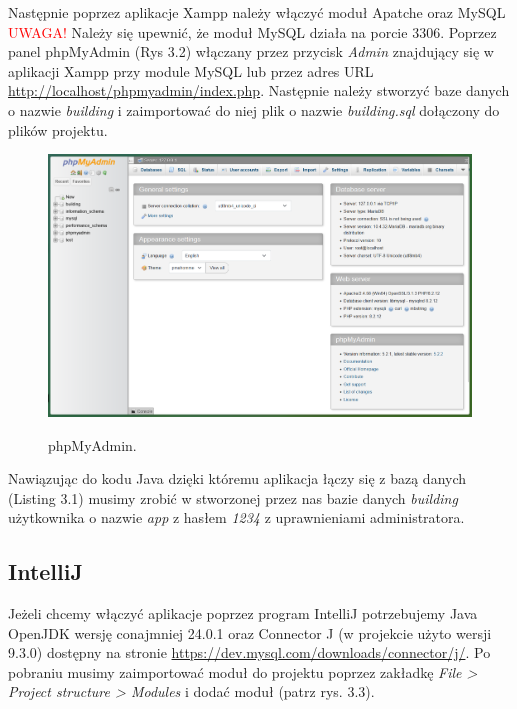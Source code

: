 \newpage
\noindent Następnie poprzez aplikacje Xampp należy włączyć moduł Apatche oraz MySQL
\textcolor{red}{UWAGA!} Należy się upewnić, że moduł MySQL działa na porcie 3306.
Poprzez panel phpMyAdmin (Rys 3.2) włączany przez przycisk \textit{Admin} znajdujący się w aplikacji
Xampp przy module MySQL lub przez adres URL  \url{http://localhost/phpmyadmin/index.php}.
Następnie należy stworzyć baze danych o nazwie \textit{building} i zaimportować
do niej plik o nazwie \textit{building.sql} dołączony do plików projektu.

\begin{figure}[H]
    \centering
    \includegraphics[width=\linewidth]{figures/phpadmin.png}\\
    \caption{phpMyAdmin.\label{fig2}}
\end{figure}

\noindent Nawiązując do kodu Java dzięki któremu aplikacja łączy się z bazą danych (Listing 3.1)
musimy zrobić w stworzonej przez nas bazie danych \textit{building} użytkownika o nazwie \textit{app} z hasłem \textit{1234} z uprawnieniami administratora.


\subsection{IntelliJ}
Jeżeli chcemy włączyć aplikacje poprzez program IntelliJ potrzebujemy Java OpenJDK wersję conajmniej 24.0.1 oraz Connector J (w projekcie użyto wersji 9.3.0)
dostępny na stronie \url{https://dev.mysql.com/downloads/connector/j/}.
Po pobraniu musimy zaimportować moduł do projektu poprzez zakładkę \textit{File > Project structure > Modules} i dodać moduł (patrz rys. 3.3).


